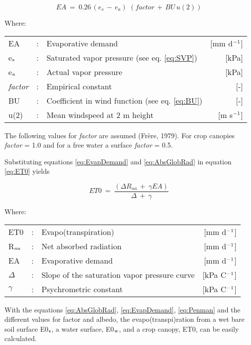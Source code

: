 \begin{equation}
\label{eq:EvapDemand}
EA~=~0.26\, (e _{s} \, -\, e _{a} )\,\, (factor\, +\, BU\, u(2))
\end{equation}

Where:\\[5pt]
\begin{tabularx}{\textwidth}{llXr}
	EA &:& Evaporative demand  & [mm d$^{{\rm -1}}$]\\
	e$_{{\rm s}}$ &:& Saturated vapor pressure (see eq. \ref{eq:SVP})  & [kPa]\\
	e$_{{\rm a}}$ &:& Actual vapor pressure  & [kPa]\\
	{\it factor} &:& Empirical constant  & [-]\\
	BU &:& Coefficient in wind function (see eq. \ref{eq:BU})  & [-]\\
	u(2) &:& Mean windspeed at 2 m height  & [m s$^{{\rm -1}}$]\\
\end{tabularx}

The following values for {\it factor} are assumed (Fr\`{e}re, 1979). For crop canopies {\it factor} =
1.0 and for a free water a surface {\it factor} = 0.5.

Substituting equations \ref{eq:EvapDemand} and \ref{eq:AbsGlobRad} in equation \ref{eq:ET0} yields

\begin{equation}
\label{eq:Penman}
ET0 ~=~{\frac{(\Delta R _{na~} +~\gamma EA)}{\Delta ~+~\gamma }}
\end{equation}

Where:\\[5pt]
\begin{tabularx}{\textwidth}{llXr}
	ET0 &:& Evapo(transpiration)  & [mm d$^{{\rm -1}}$]\\
	R$_{{\rm na}}$ &:& Net absorbed radiation  & [mm d$^{{\rm -1}}$]\\
	EA &:& Evaporative demand  & [mm d$^{{\rm -1}}$]\\
	$\Delta$ &:& Slope of the saturation vapor pressure curve   & [kPa \degrees C$^{{\rm -1}}$]\\
	$\gamma$ &:& Psychrometric constant  & [kPa \degrees C$^{{\rm -1}}$]
\end{tabularx}

With the equations \ref{eq:AbsGlobRad}, \ref{eq:EvapDemand}, \ref{eq:Penman} and the different values for factor and albedo, the evapo(transpi)ration from a wet bare soil surface E0$_{{\rm s}}$, a water surface, E0$_{{\rm w}}$, and a crop canopy, ET0, can be easily calculated.


